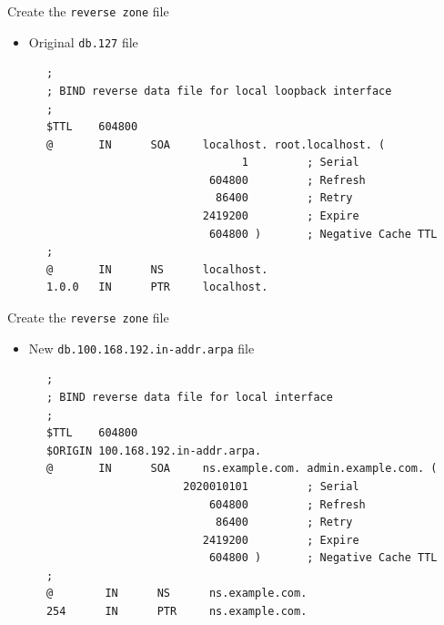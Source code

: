 \documentclass[xcolor=table,aspectratio=169]{beamer}
\begin{document}
\begin{frame}[fragile]{Create the \texttt{reverse zone} file}
  \begin{itemize}
    \item Original \texttt{db.127} file
  \end{itemize}
  \begin{tcolorbox}
    \lstset{
      basicstyle=\tiny\ttfamily,
    }
    \begin{lstlisting}
      ;
      ; BIND reverse data file for local loopback interface
      ;
      $TTL    604800
      @       IN      SOA     localhost. root.localhost. (
                                    1         ; Serial
                               604800         ; Refresh
                                86400         ; Retry
                              2419200         ; Expire
                               604800 )       ; Negative Cache TTL
      ;
      @       IN      NS      localhost.
      1.0.0   IN      PTR     localhost.
    \end{lstlisting}
  \end{tcolorbox}
\end{frame}

\begin{frame}[fragile]{Create the \texttt{reverse zone} file}
  \begin{itemize}
    \item New \texttt{db.100.168.192.in-addr.arpa} file
  \end{itemize}
  \begin{tcolorbox}
    \lstset{
      basicstyle=\tiny\ttfamily,
    }
    \begin{lstlisting}
      ;
      ; BIND reverse data file for local interface
      ;
      $TTL    604800
      $ORIGIN 100.168.192.in-addr.arpa.
      @       IN      SOA     ns.example.com. admin.example.com. (
                           2020010101         ; Serial
                               604800         ; Refresh
                                86400         ; Retry
                              2419200         ; Expire
                               604800 )       ; Negative Cache TTL
      ;
      @        IN      NS      ns.example.com.
      254      IN      PTR     ns.example.com.
          \end{lstlisting}
  \end{tcolorbox}
\end{frame}
\end{document}
